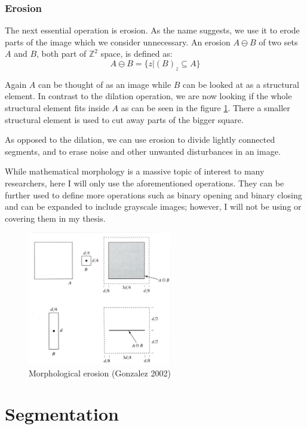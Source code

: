 \documentclass[
  digital,     %
  oneside,     %
  nosansbold,  %
  nocolorbold, %
  lof,         %
  lot,         %
]{fithesis4}
\newcommand*{\Z}{\ensuremath{\mathbb{Z}}}
\begin{document}
\subsubsection{Erosion}

The next essential operation is erosion. As the name suggests, we use it to erode
parts of the image which we consider unnecessary. An erosion $A \ominus B$ of
two sets $A$ and $B$, both part of $\Z^2$ space, is defined as: 
$$A \ominus B = \{z | (B)_z \subseteq A\}$$

Again $A$ can be thought of as an image while $B$ can be looked at as a structural
element. In contrast to the dilation operation, we are now looking if the whole
structural element fits inside $A$ as can be seen in the figure
\ref{fig:morph_erosion}. There a smaller structural element is used to cut away
parts of the bigger square.

As opposed to the dilation, we can use erosion to divide lightly connected
segments, and to erase noise and other unwanted disturbances in an image.

While mathematical morphology is a massive topic of interest to many
researchers, here I will only use the aforementioned operations. They can be
further used to define more operations such as binary opening and binary closing
and can be expanded to include grayscale images; however, I will not be using or covering
them in my thesis.

\begin{figure}
    \begin{center}
        \includegraphics[width=6.3cm]{resources/morph_erosion.jpg}
    \end{center}
    \caption{Morphological erosion (Gonzalez 2002)} %
    \label{fig:morph_erosion}
\end{figure}

\section{Segmentation}
\end{document}

